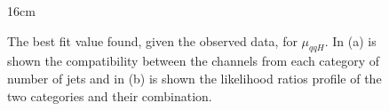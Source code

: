 \begin{figure}[hbtp]{16cm}
	\caption{The best fit value found, given the observed data, for $\mu_{qqH}$. In (a) is shown the compatibility between the channels from each category of number of jets and in (b) is shown the likelihood ratios profile of the two categories and their combination.}
	\centering
	\quad
	\label{fig:vbf_best_fits}
\end{figure}


